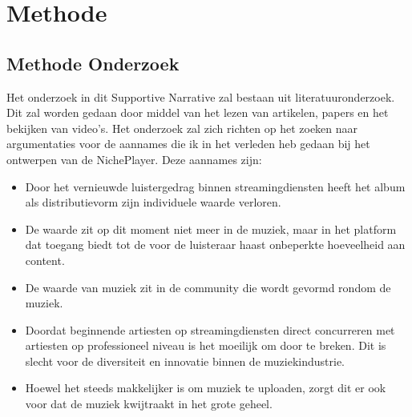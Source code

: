 \section{Methode}

\subsection{Methode Onderzoek}

Het onderzoek in dit Supportive Narrative zal bestaan uit literatuuronderzoek. Dit zal worden gedaan door middel van het lezen van artikelen, papers en het bekijken van video's. Het onderzoek zal zich richten op het zoeken naar argumentaties voor de aannames die ik in het verleden heb gedaan bij het ontwerpen van de NichePlayer. Deze aannames zijn:

\begin{itemize}
  \item Door het vernieuwde luistergedrag binnen streamingdiensten heeft het album als distributievorm zijn individuele waarde verloren.
  \item De waarde zit op dit moment niet meer in de muziek, maar in het platform dat toegang biedt tot de voor de luisteraar haast onbeperkte hoeveelheid aan content.
  \item De waarde van muziek zit in de community die wordt gevormd rondom de muziek.
  \item Doordat beginnende artiesten op streamingdiensten direct concurreren met artiesten op professioneel niveau is het moeilijk om door te breken. Dit is slecht voor de diversiteit en innovatie binnen de muziekindustrie.
  \item Hoewel het steeds makkelijker is om muziek te uploaden, zorgt dit er ook voor dat de muziek kwijtraakt in het grote geheel.
\end{itemize}

